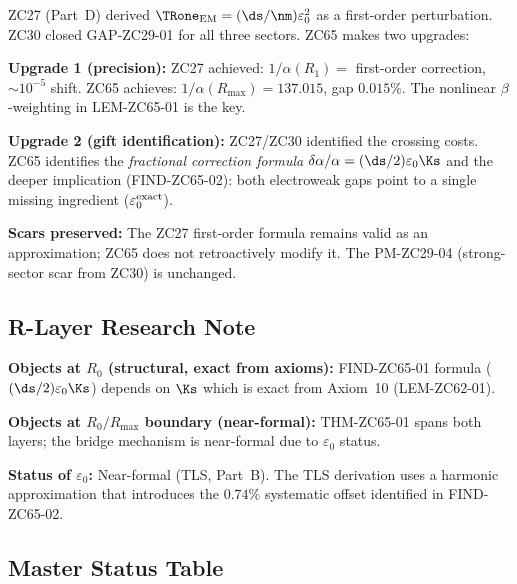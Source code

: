 \documentclass[12pt, a4paper]{article}
\begin{document}
\begin{keybox}[title={How ZC65 Upgrades ZC27/ZC30}]
ZC27 (Part~D) derived $\TRone_{\rm EM} = (\ds/\nm)\varepsilon_0^2$
as a first-order perturbation.
ZC30 closed GAP-ZC29-01 for all three sectors.
ZC65 makes two upgrades:

\medskip
\textbf{Upgrade 1 (precision):}
ZC27 achieved: $1/\alpha(R_1) = $ first-order correction,
$\sim 10^{-5}$ shift.
ZC65 achieves: $1/\alpha(R_{\max}) = 137.015$, gap $0.015\%$.
The nonlinear $\beta$-weighting in LEM-ZC65-01 is the key.

\medskip
\textbf{Upgrade 2 (gift identification):}
ZC27/ZC30 identified the crossing costs.
ZC65 identifies the \emph{fractional correction formula}
$\delta\alpha/\alpha = (\ds/2)\varepsilon_0\Ks$
and the deeper implication (FIND-ZC65-02):
both electroweak gaps point to a single missing
ingredient ($\varepsilon_0^{\rm exact}$).

\medskip
\textbf{Scars preserved:}
The ZC27 first-order formula remains valid as an
approximation; ZC65 does not retroactively modify it.
The PM-ZC29-04 (strong-sector scar from ZC30) is unchanged.
\end{keybox}

\subsection{R-Layer Research Note}
\label{sec:rlayer}

\begin{layerbox}[title={R-Layer Assignments for ZC65}]
\textbf{Objects at $R_0$ (structural, exact from axioms):}
FIND-ZC65-01 formula ($(\ds/2)\varepsilon_0\Ks$) depends
on $\Ks$ which is exact from Axiom~10 (LEM-ZC62-01).

\textbf{Objects at $R_0/R_{\max}$ boundary (near-formal):}
THM-ZC65-01 spans both layers; the bridge mechanism
is near-formal due to $\varepsilon_0$ status.

\textbf{Status of $\varepsilon_0$:}
Near-formal (TLS, Part~B). The TLS derivation uses
a harmonic approximation that introduces the $0.74\%$
systematic offset identified in FIND-ZC65-02.
\end{layerbox}

\subsection{Master Status Table}
\label{sec:status}
\end{document}
